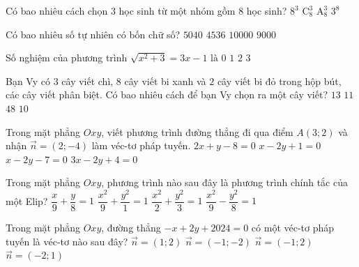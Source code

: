 
%

\caulc
\begin{ex} %
	Có bao nhiêu cách chọn $3$ học sinh từ một nhóm gồm $8$ học sinh?
	\choice
	{$8^3$}
	{\True $\mathrm{C}_8^3$}
	{$\mathrm{A}_8^3$}
	{$3^8$}
	\loigiai{
	
	}
\end{ex}

\begin{ex}%
	Có bao nhiêu số tự nhiên có bốn chữ số?
	\choice
	{$5040$}
	{$4536$}
	{$10000$}
	{\True $9000$}
	\loigiai{
	
	}
\end{ex}
\begin{ex} %
	Số nghiệm của phương trình $\sqrt{x^2+3}=3x-1$ là
	\choice
	{$0$}
	{\True $1$}
	{$2$}
	{$3$}
	\loigiai{
		
	}
\end{ex}

\begin{ex}%
	Bạn Vy có $3$ cây viết chì, $8$ cây viết bi xanh và $2$ cây viết bi đỏ trong hộp bút, các cây viết phân biệt. Có bao nhiêu cách để bạn Vy chọn ra một cây viết?
	\choice
	{\True $13$}
	{$11$}
	{$48$}
	{$10$}
	\loigiai{
		
	}
\end{ex}
\begin{ex} %
	Trong mặt phẳng $Oxy$, viết phương trình đường thẳng đi qua điểm $A(3;2)$ và nhận $\overrightarrow{n}=(2;-4)$ làm véc-tơ pháp tuyến.
	\choice
	{$2x+y-8=0$}
	{\True $x-2y+1=0$}
	{$x-2y-7=0$}
	{$3x-2y+4=0$}
	\loigiai{
	
	}
\end{ex}

\begin{ex}%
	Trong mặt phẳng $Oxy$, phương trình nào sau đây là phương trình chính tắc của một Elip?
	\choice
	{$\dfrac{x}{9}+\dfrac{y}{8}=1$}
	{\True $\dfrac{x^2}{9}+\dfrac{y^2}{1}=1$}
	{$\dfrac{x^2}{2}+\dfrac{y^2}{3}=1$}
	{$\dfrac{x^2}{9}-\dfrac{y^2}{8}=1$}
	\loigiai{
	
	}
\end{ex}
\begin{ex} %
	Trong mặt phẳng $Oxy$, đường thẳng $-x+2y+2024=0$ có một véc-tơ pháp tuyến là véc-tơ nào sau đây?
	\choice
	{$\overrightarrow{n}=(1;2)$}
	{$\overrightarrow{n}=(-1;-2)$}
	{\True $\overrightarrow{n}=(-1;2)$}
	{$\overrightarrow{n}=(-2;1)$}
	\loigiai{
	
	}
\end{ex}

